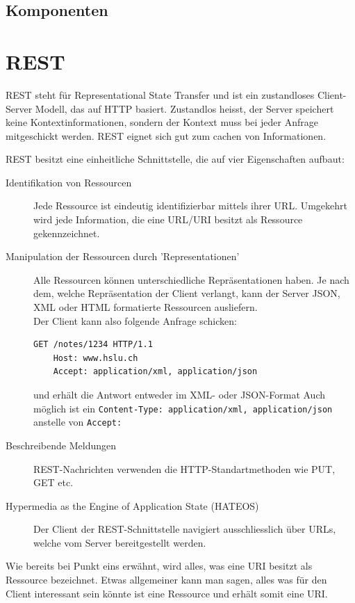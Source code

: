 \documentclass[a4paper, 11pt]{article}
\newcommand{\code}[1]{\texttt{#1}}
\begin{document}
\subsection{Komponenten}

\section{REST}
REST steht für Representational State Transfer und ist ein zustandloses Client-Server Modell, das auf HTTP basiert. Zustandlos heisst, der Server speichert keine Kontextinformationen, sondern der Kontext muss bei jeder Anfrage mitgeschickt werden. REST eignet sich gut zum cachen von Informationen.
\vspace{10px}

\noindent REST besitzt eine einheitliche Schnittstelle, die auf vier Eigenschaften aufbaut:

\begin{description}
	\item[Identifikation von Ressourcen ] Jede Ressource ist eindeutig identifizierbar mittels ihrer URL. Umgekehrt wird jede Information, die eine URL/URI besitzt als Ressource gekennzeichnet.
	\item[Manipulation der Ressourcen durch 'Representationen' ] Alle Ressourcen können unterschiedliche Repräsentationen haben. Je nach dem, welche Repräsentation der Client verlangt, kann der Server JSON, XML oder HTML formatierte Ressourcen ausliefern. \\
	Der Client kann also folgende Anfrage schicken:
	\begin{lstlisting}[language=html]
	GET /notes/1234 HTTP/1.1 
	Host: www.hslu.ch
	Accept: application/xml, application/json
	\end{lstlisting}
	und erhält die Antwort entweder im XML- oder JSON-Format
	Auch möglich ist ein \code{Content-Type: application/xml, application/json} anstelle von \code{Accept: } 
	\item[Beschreibende Meldungen ] REST-Nachrichten verwenden die HTTP-Standartmethoden wie PUT, GET etc. 
	\item[Hypermedia as the Engine of Application State (HATEOS)] Der Client der REST-Schnittstelle navigiert ausschliesslich über URLs, welche vom Server bereitgestellt werden.
\end{description}
\vspace{10px}

\noindent Wie bereits bei Punkt eins erwähnt, wird alles, was eine URI besitzt als Ressource bezeichnet. Etwas allgemeiner kann man sagen, alles was für den Client interessant sein könnte ist eine Ressource und erhält somit eine URI.
\vspace{10px}
\end{document}
